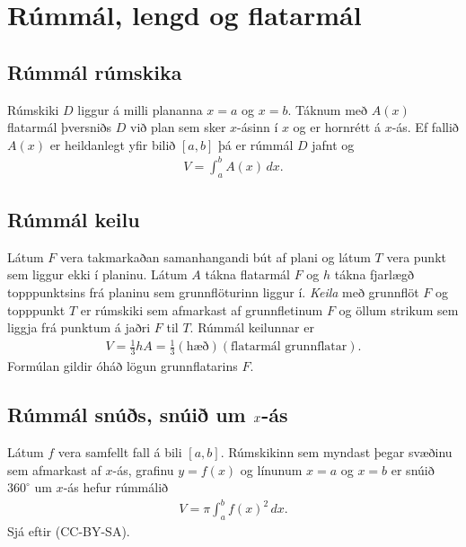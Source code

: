 \documentclass[a4paper,10pt,icelandic]{sphinxmanual}
\begin{document}
\ignorespaces 

\section{Rúmmál, lengd og flatarmál}
\label{\detokenize{kafli07:rummal-lengd-og-flatarmal}}\label{\detokenize{kafli07:index-1}}

\subsection{Rúmmál rúmskika}
\label{\detokenize{kafli07:rummal-rumskika}}
Rúmskiki \(D\) liggur á milli plananna \(x=a\) og \(x=b\).
Táknum með \(A(x)\) flatarmál þversniðs \(D\) við plan sem sker
\(x\)-ásinn í \(x\) og er hornrétt á \(x\)-ás. Ef fallið
\(A(x)\) er heildanlegt yfir bilið \([a, b]\) þá er rúmmál
\(D\) jafnt og
\begin{equation*}
\begin{split}V=\int_a^b A(x)\,dx.\end{split}
\end{equation*}
\ignorespaces 

\subsection{Rúmmál keilu}
\label{\detokenize{kafli07:rummal-keilu}}\label{\detokenize{kafli07:index-2}}
Látum \(F\) vera takmarkaðan samanhangandi bút af plani og látum
\(T\) vera punkt sem liggur ekki í planinu. Látum \(A\) tákna
flatarmál \(F\) og \(h\) tákna fjarlægð topppunktsins frá
planinu sem grunnflöturinn liggur í. \textit{Keila} með grunnflöt \(F\) og
topppunkt \(T\) er rúmskiki sem afmarkast af grunnfletinum \(F\)
og öllum strikum sem liggja frá punktum á jaðri \(F\) til \(T\).
Rúmmál keilunnar er
\begin{equation*}
\begin{split}V=\frac{1}{3}hA=\frac{1}{3}(\mbox{hæð})(\mbox{flatarmál
grunnflatar}).\end{split}
\end{equation*}
Formúlan gildir óháð lögun grunnflatarins \(F\).

\ignorespaces 

\subsection{Rúmmál snúðs, snúið um \protect\(x\protect\)-ás}
\label{\detokenize{kafli07:rummal-snus-snui-um-as}}\label{\detokenize{kafli07:index-3}}
Látum \(f\) vera samfellt fall á bili \([a, b]\). Rúmskikinn sem
myndast þegar svæðinu sem afmarkast af \(x\)-ás, grafinu
\(y=f(x)\) og línunum \(x=a\) og \(x=b\) er snúið
\(360^\circ\) um \(x\)-ás hefur rúmmálið
\begin{equation*}
\begin{split}V=\pi\int_a^b f(x)^2\,dx.\end{split}
\end{equation*}
Sjá  
eftir  (CC-BY-SA).
\end{document}
